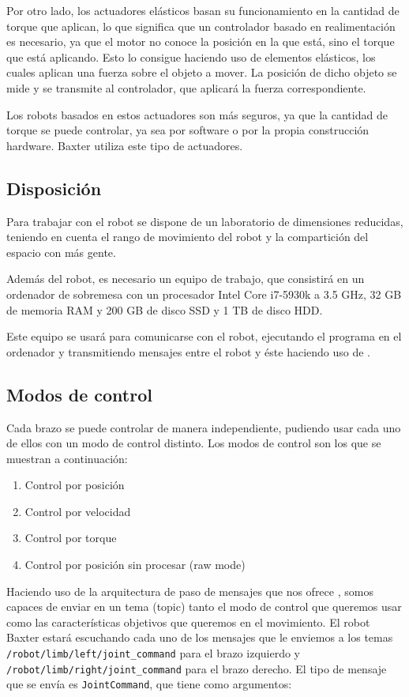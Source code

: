 Por otro lado, los actuadores elásticos basan su funcionamiento en la cantidad de torque que aplican, lo que significa que un controlador basado en realimentación es necesario, ya que el motor no conoce la posición en la que está, sino el torque que está aplicando. Esto lo consigue haciendo uso de elementos elásticos, los cuales aplican una fuerza sobre el objeto a mover. La posición de dicho objeto se mide y se transmite al controlador, que aplicará la fuerza correspondiente.

Los robots basados en estos actuadores son más seguros, ya que la cantidad de torque se puede controlar, ya sea por software o por la propia construcción hardware. Baxter utiliza este tipo de actuadores.

\subsection{Disposición}
Para trabajar con el robot se dispone de un laboratorio de dimensiones reducidas, teniendo en cuenta el rango de movimiento del robot y la compartición del espacio con más gente.

Además del robot, es necesario un equipo de trabajo, que consistirá en un ordenador de sobremesa con un procesador Intel Core i7-5930k a 3.5 GHz, 32 GB de memoria RAM y 200 GB de disco SSD y 1 TB de disco HDD.

Este equipo se usará para comunicarse con el robot, ejecutando el programa en el ordenador y transmitiendo mensajes entre el robot y éste haciendo uso de \ros.

\subsection{Modos de control}
Cada brazo se puede controlar de manera independiente, pudiendo usar cada uno de ellos con un modo de control distinto. Los modos de control son los que se muestran a continuación:

\begin{enumerate}
\item Control por posición
\item Control por velocidad
\item Control por torque
\item Control por posición sin procesar (raw mode)
\end{enumerate}

Haciendo uso de la arquitectura de paso de mensajes que nos ofrece \ros, somos capaces de enviar en un tema (topic) tanto el modo de control que queremos usar como las características objetivos que queremos en el movimiento. El robot Baxter estará escuchando cada uno de los mensajes que le enviemos a los temas \texttt{/robot/limb/left/joint\_command} para el brazo izquierdo y \texttt{/robot/limb/right/joint\_command} para el brazo derecho. El tipo de mensaje que se envía es \texttt{JointCommand}, que tiene como argumentos:

